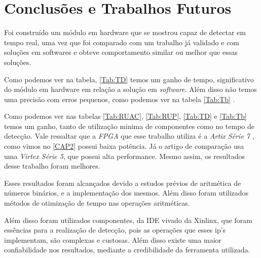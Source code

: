 \chapter[Conclusões e Trabalhos Futuros]{Conclusões e Trabalhos Futuros}


Foi construído um módulo em hardware que se mostrou capaz de detectar em tempo real, uma vez que foi comparado com um trabalho já validado e com soluções em softwares e obteve comportamento similar ou melhor que essas soluções.

Como podemos ver na tabela, \ref{Tab:TD} temos um ganho de tempo, significativo do módulo em hardware em relação a solução em \textit{software}. Além disso não temos uma precisão com erros pequenos, como podemos ver na tabela \ref{Tab:Tb} . 

Como podemos ver nas tabelas \ref{Tab:RUAC}, \ref{Tab:RUP}, \ref{Tab:TD} e \ref{Tab:Tb} temos um ganho, tanto de utilização minima de componentes como no tempo de detecção. Vale ressaltar que a \textit{FPGA} que esse trabalho utiliza é a \textit{Artix Série 7} , como vimos no \ref{CAP2} possui baixa potência. Já o artigo de comparação usa uma \textit{Virtex Série 5}, que possui alta performance. Mesmo assim, os resultados desse trabalho foram melhores.

Esses resultados foram alcançados devido a estudos prévios de aritmética de números binários,  e a implementação dos mesmos. Além disso foram utilizados métodos de otimização de tempo nas  operações aritméticas.
	
Além disso foram utilizados componentes, da IDE vivado da Xinlinx, que foram essências para a realização de detecção, pois as operações que esses ip's implementam, são complexas e custosas. Além disso existe uma maior confiabilidade nos resultados, mediante a credibilidade da ferramenta utilizada.